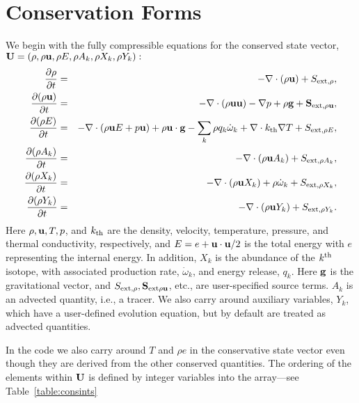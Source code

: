 \section{Conservation Forms}
We begin with the fully compressible equations for the conserved state vector, 
${\bf U} = (\rho, \rho {\bf u}, \rho E, \rho A_k, \rho X_k, \rho Y_k):$
\begin{eqnarray}
\frac{\partial \rho}{\partial t} &=& - \nabla \cdot (\rho {\bf u}) + S_{{\rm ext},\rho}, \\
\frac{\partial (\rho {\bf u})}{\partial t} &=& - \nabla \cdot (\rho {\bf u} {\bf u}) - \nabla p +\rho {\bf g} + {\bf S}_{{\rm ext},\rho{\bf u}}, \\
\frac{\partial (\rho E)}{\partial t} &=& - \nabla \cdot (\rho {\bf u} E + p {\bf u}) + \rho {\bf u} \cdot {\bf g} - \sum_k {\rho q_k \dot\omega_k} + \nabla\cdot{k_\mathrm{th}}\nabla T + S_{{\rm ext},\rho E}, \\
\frac{\partial (\rho A_k)}{\partial t} &=& - \nabla \cdot (\rho {\bf u} A_k) + S_{{\rm ext},\rho A_k}, \\
\frac{\partial (\rho X_k)}{\partial t} &=& - \nabla \cdot (\rho {\bf u} X_k) + \rho \dot\omega_k + S_{{\rm ext},\rho X_k}, \\
\frac{\partial (\rho Y_k)}{\partial t} &=& - \nabla \cdot (\rho {\bf u} Y_k) + S_{{\rm ext},\rho Y_k}.\label{eq:compressible-equations}
\end{eqnarray}
Here $\rho, {\bf u}, T, p$, and ${k_\mathrm{th}}$ are the density, velocity,
temperature, pressure, and thermal conductivity, respectively, and $E
= e + {\bf u} \cdot {\bf u} / 2$ is the total energy with $e$ representing the
internal energy.  In addition, $X_k$ is the abundance of the $k^{\rm
  th}$ isotope, with associated production rate, $\dot\omega_k$, and
energy release, $q_k$.  Here ${\bf g}$ is the gravitational vector, and
$S_{{\rm ext},\rho}, {\bf S}_{{\rm ext}\rho{\bf u}}$, etc., are user-specified
source terms.  $A_k$ is an advected quantity, i.e., a tracer.  We also
carry around auxiliary variables, $Y_k$, which have a user-defined
evolution equation, but by default are treated as advected quantities.

In the code we also carry around $T$ and $\rho e$ in the conservative
state vector even though they are derived from the other conserved
quantities.  The ordering of the elements within ${\bf U}$ is defined
by integer variables into the array---see
Table~\ref{table:consints}

